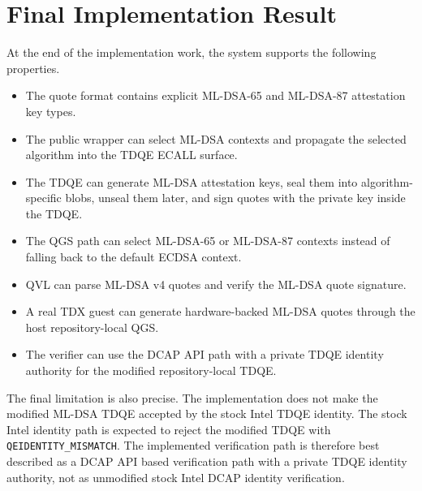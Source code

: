 \section{Final Implementation Result}

At the end of the implementation work, the system supports the following
properties.

\begin{itemize}
  \item The quote format contains explicit ML-DSA-65 and ML-DSA-87 attestation
        key types.
  \item The public wrapper can select ML-DSA contexts and propagate the
        selected algorithm into the TDQE ECALL surface.
  \item The TDQE can generate ML-DSA attestation keys, seal them into
        algorithm-specific blobs, unseal them later, and sign quotes with the
        private key inside the TDQE.
  \item The QGS path can select ML-DSA-65 or ML-DSA-87 contexts instead of
        falling back to the default ECDSA context.
  \item QVL can parse ML-DSA v4 quotes and verify the ML-DSA quote signature.
  \item A real TDX guest can generate hardware-backed ML-DSA quotes through
        the host repository-local QGS.
  \item The verifier can use the DCAP API path with a private TDQE identity
        authority for the modified repository-local TDQE.
\end{itemize}

The final limitation is also precise. The implementation does not make the
modified ML-DSA TDQE accepted by the stock Intel TDQE identity. The stock Intel
identity path is expected to reject the modified TDQE with
\texttt{QEIDENTITY\_MISMATCH}. The implemented verification path is therefore
best described as a DCAP API based verification path with a private TDQE
identity authority, not as unmodified stock Intel DCAP identity verification.
